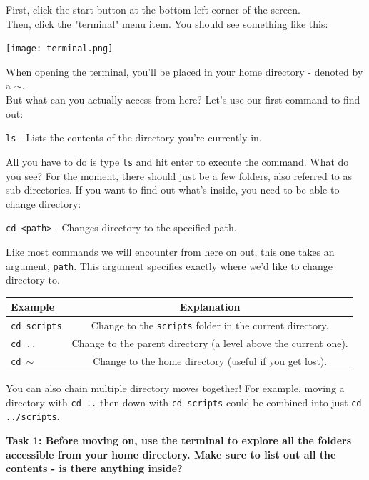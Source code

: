 \documentclass[a4paper,11pt,parskip=half-]{scrartcl}
\begin{document}
First, click the start button at the bottom-left corner of the screen. \\
Then, click the "terminal" menu item. You should see something like this:

\centering \texttt{[image: terminal.png]}

\raggedright


When opening the terminal, you'll be placed in your home directory - denoted by a $\sim$. \\ 
But what can you actually access from here? Let's use our first command to find out:

\Large \texttt{ls} \normalsize - Lists the contents of the directory you're currently in.

All you have to do is type \texttt{ls} and hit enter to execute the command. 
What do you see? 
For the moment, there should just be a few folders, also referred to as sub-directories.
If you want to find out what's inside, you need to be able to change directory:

\Large \texttt{cd <path>} \normalsize - Changes directory to the specified path.

Like most commands we will encounter from here on out, this one takes an argument, \texttt{path}. 
This argument specifies exactly where we'd like to change directory to.

\centering
\begin{tabular}{l|c}
    Example & Explanation \\
    \hline
    \Large \texttt{cd scripts} \normalfont & Change to the \texttt{scripts} folder in the current directory.  \\
    \Large \texttt{cd ..} \normalfont & Change to the parent directory (a level above the current one). \\
    \Large \texttt{cd $\sim$} \normalfont & Change to the home directory (useful if you get lost).
\end{tabular}

\raggedright

You can also chain multiple directory moves together! 
For example, moving a directory with \texttt{cd ..} then down with \texttt{cd scripts} could be combined into just \texttt{cd ../scripts}.

\bfseries Task 1: \normalfont 
Before moving on, use the terminal to explore all the folders accessible from your home directory. 
Make sure to list out all the contents - is there anything inside? 
\end{document}
